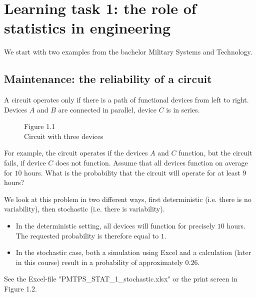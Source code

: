 \section{Learning task 1: the role of statistics in engineering}

We start with two examples from the bachelor Military Systems and Technology.

\subsection*{Maintenance: the reliability of a circuit}
A circuit operates only if there is a path of functional devices from left to right. 
Devices $A$ and $B$ are connected in parallel, device $C$ is in series.

\begin{figure}[h]
    \centering
    \caption*{Figure 1.1 \\ Circuit with three devices}
\end{figure}

For example, the circuit operates if the devices $A$ and $C$ function, but the circuit fails, if device $C$ does not function.
Assume that all devices function on average for $10$ hours. 
What is the probability that the circuit will operate for at least $9$ hours?

We look at this problem in two different ways, first deterministic (i.e. there is no variability), then stochastic (i.e. there is variability).
\begin{itemize}
    \item In the deterministic setting, all devices will function for precisely $10$ hours. The requested probability is therefore equal to $1$.
    \item In the stochastic case, both a simulation using Excel and a calculation (later in this course) result in a probability of approximately $0.26$.
\end{itemize}
See the Excel-file "PMTPS\_STAT\_1\_stochastic.xlsx" or the print screen in Figure 1.2.

